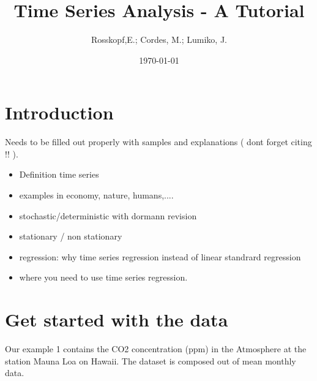 \documentclass[11pt, a4paper]{article} %
\begin{document}



\title{Time Series Analysis - A Tutorial}

\author{Rosskopf,E.; Cordes, M.; Lumiko, J.}

\date{\today} %

\maketitle


\tableofcontents

\section{Introduction}

Needs to be filled out properly with samples and explanations ( dont forget citing !! ).\\



\begin{itemize}
  \item Definition time series\\
  \item examples in economy, nature, humans,.... \\
  \item stochastic/deterministic with dormann revision\\
  \item stationary / non stationary \\
  \item regression: why time series regression instead of linear standrard regression\\
  \item  where you need to use time series regression.\\
\end{itemize}

\section{Get started with the data}

Our example 1 contains the CO2 concentration (ppm) in the Atmosphere at the station Mauna Loa on Hawaii. The dataset is composed out of mean monthly data. \\
\end{document}
